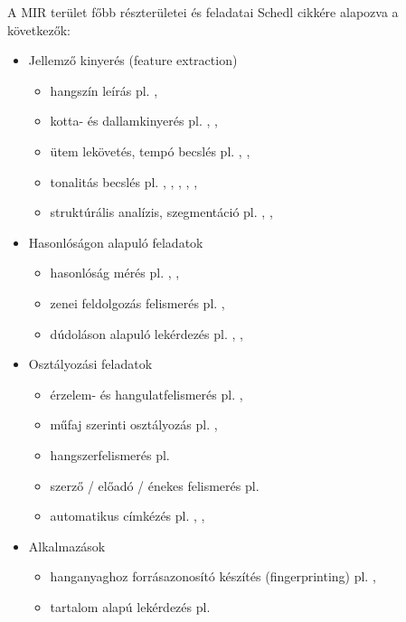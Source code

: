 A MIR terület főbb részterületei és feladatai Schedl \cite{Schedl2014} cikkére alapozva a következők:

\begin{itemize}
\item Jellemző kinyerés (feature extraction)
	\begin{itemize}
	\item hangszín leírás pl. \cite{hangszin1}, \cite{hangszin2}
	\item kotta- és dallamkinyerés pl. \cite{kotta1}, \cite{kotta2}, \cite{kotta3}
	\item ütem lekövetés, tempó becslés pl. \cite{tempo1}, \cite{tempo2}, \cite{tempo3}
	\item tonalitás becslés pl. \cite{tonality1}, \cite{tonality2}, \cite{tonality3}, \cite{tonality4}, \cite{tonality5}, \cite{tonality6}
	\item struktúrális analízis, szegmentáció pl. \cite{structural1}, \cite{structural2}, \cite{structural3}
	\end{itemize}
\item Hasonlóságon alapuló feladatok
	\begin{itemize}
	\item hasonlóság mérés pl. \cite{similarity1}, \cite{similarity2}, \cite{similarity3}
	\item zenei feldolgozás felismerés pl. \cite{cover1}, \cite{cover2}
	\item dúdoláson alapuló lekérdezés pl. \cite{humming1}, \cite{humming2}, \cite{humming3}
	\end{itemize}
\item Osztályozási feladatok
	\begin{itemize}
	\item érzelem- és hangulatfelismerés pl. \cite{mood1}, \cite{mood2}
	\item műfaj szerinti osztályozás pl. \cite{genre1}, \cite{genre2}
	\item hangszerfelismerés pl. \cite{instrument1}
	\item szerző / előadó / énekes felismerés pl. \cite{singer1}
	\item automatikus címkézés pl. \cite{tagging1}, \cite{tagging2}, \cite{tagging3}
	\end{itemize}
\item Alkalmazások
	\begin{itemize}
	\item hanganyaghoz forrásazonosító készítés (fingerprinting) pl. \cite{fingerprint1}, \cite{fingerprint2}
	\item tartalom alapú lekérdezés pl. \cite{contentbased1}

\end{itemize}
\end{itemize}
